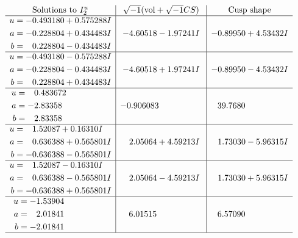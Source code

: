 \documentclass[1p]{elsarticle_modified}
\theoremstyle{definition}
\newcommand{\I}{\sqrt{-1}}
\begin{document}
$$\begin{array}{c|c|c}  
\text{Solutions to }I^u_{2}& \I (\text{vol} + \sqrt{-1}CS) & \text{Cusp shape}\\
 \hline 
\begin{aligned}
u &= -0.493180 + 0.575288 I \\
a &= -0.228804 + 0.434483 I \\
b &= \phantom{-}0.228804 - 0.434483 I\end{aligned}
 & -4.60518 - 1.97241 I & -0.89950 + 4.53432 I \\ \hline\begin{aligned}
u &= -0.493180 - 0.575288 I \\
a &= -0.228804 - 0.434483 I \\
b &= \phantom{-}0.228804 + 0.434483 I\end{aligned}
 & -4.60518 + 1.97241 I & -0.89950 - 4.53432 I \\ \hline\begin{aligned}
u &= \phantom{-}0.483672\phantom{ +0.000000I} \\
a &= -2.83358\phantom{ +0.000000I} \\
b &= \phantom{-}2.83358\phantom{ +0.000000I}\end{aligned}
 & -0.906083\phantom{ +0.000000I} & \phantom{-}39.7680\phantom{ +0.000000I} \\ \hline\begin{aligned}
u &= \phantom{-}1.52087 + 0.16310 I \\
a &= \phantom{-}0.636388 + 0.565801 I \\
b &= -0.636388 - 0.565801 I\end{aligned}
 & \phantom{-}2.05064 + 4.59213 I & \phantom{-}1.73030 - 5.96315 I \\ \hline\begin{aligned}
u &= \phantom{-}1.52087 - 0.16310 I \\
a &= \phantom{-}0.636388 - 0.565801 I \\
b &= -0.636388 + 0.565801 I\end{aligned}
 & \phantom{-}2.05064 - 4.59213 I & \phantom{-}1.73030 + 5.96315 I \\ \hline\begin{aligned}
u &= -1.53904\phantom{ +0.000000I} \\
a &= \phantom{-}2.01841\phantom{ +0.000000I} \\
b &= -2.01841\phantom{ +0.000000I}\end{aligned}
 & \phantom{-}6.01515\phantom{ +0.000000I} & \phantom{-}6.57090\phantom{ +0.000000I}\\
 \hline 
 \end{array}$$\newpage\newpage\renewcommand{\arraystretch}{1}
\end{document}
